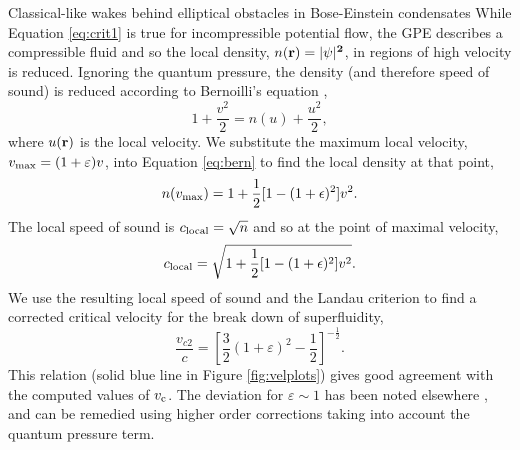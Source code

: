 \begin{chapter}{\label{cha:wake}Classical-like wakes behind elliptical obstacles in Bose-Einstein condensates}
While Equation \ref{eq:crit1} is true for incompressible potential flow, the GPE describes a compressible fluid and so the local density, $n(\bf r) = |\psi|^2$, in regions of high velocity is reduced. Ignoring the quantum pressure, the density (and therefore speed of sound) is reduced according to Bernoilli's equation \cite{win01},
\begin{equation}
1+\frac{v^2}{2} = n(u)+\frac{u^2}{2},
\label{eq:bern}
\end{equation}
where $u(\bf r)$ is the local velocity. We substitute the maximum local velocity, $v_{\rm max}=(1+\varepsilon)v$, into Equation \ref{eq:bern} to find the local density at that point,
\begin{equation*}
n(v_{\rm max}) = 1+\frac{1}{2}[1-(1+\epsilon)^2]v^2.
\end{equation*}
The local speed of sound is $c_{\rm local}=\sqrt{n}$ and so at the point of maximal velocity,
\begin{equation*}
c_{\rm local} = \sqrt{1+\frac{1}{2}[1-(1+\epsilon)^2]v^2}.
\end{equation*}
We use the resulting local speed of sound and the Landau criterion to find a corrected critical velocity for the break down of superfluidity, 
\begin{equation}
\frac{v_{c2}}{c} = \left [\frac{3}{2}(1+\varepsilon)^2 - \frac{1}{2}\right]^{-\frac{1}{2}}.
\label{eq:crit2}
\end{equation}
This relation (solid blue line in Figure \ref{fig:velplots}) gives good agreement with the computed values of $v_{\rm c}$.  The deviation for $\varepsilon \sim 1$ has been noted elsewhere \cite{rica2001}, and can be remedied using higher order corrections taking into account the quantum pressure term.


\end{chapter}
